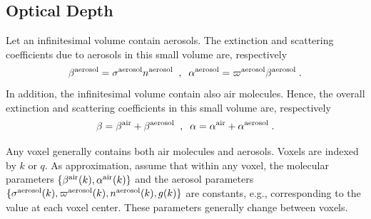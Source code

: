 \documentclass[10pt,twocolumn,letterpaper]{article}
\begin{document}
\subsection{Optical Depth}
\label{sec:optical-depth}

Let an infinitesimal volume contain aerosols. The extinction and scattering coefficients
due to aerosols in this small volume are, respectively
\begin{equation}
  \beta^{\rm aerosol}=\sigma^{\rm aerosol} n^{\rm aerosol}
  \;\;,\;\;
  \alpha^{\rm aerosol}=\varpi^{\rm aerosol} \beta^{\rm aerosol}
  \;.
  \label{eq:betaer}
\end{equation}
In addition, the infinitesimal volume contain also air molecules. Hence, the overall
extinction and scattering coefficients in this small volume are, respectively
\begin{equation}
  \beta=\beta^{\rm air}+\beta^{\rm aerosol}
  \;\;,\;\;
  \alpha=\alpha^{\rm air}+\alpha^{\rm aerosol}
  \;.
  \label{eq:betair}
\end{equation}

Any voxel generally contains both air molecules and aerosols. Voxels are indexed by $k$ or $q$.
As approximation, assume that within any voxel, the molecular parameters
$\{ \beta^{\rm air}(k),\alpha^{\rm air}(k)\}$ and the aerosol parameters
$\{ \sigma^{\rm aerosol}(k),\varpi^{\rm aerosol}(k), n^{\rm aerosol}(k),g(k)\}$
are constants, e.g., corresponding to the value at each voxel center. These parameters generally change
between voxels.
\end{document}
